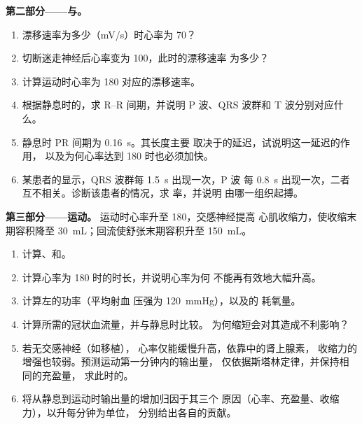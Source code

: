 \begin{problem}
\medskip
\noindent\textbf{第二部分——与。}
\begin{enumerate}[resume]
  \item 漂移速率为多少（\unit{mV/s}）时心率为 70？
  \item 切断迷走神经后心率变为 100，此时的漂移速率
        为多少？
  \item 计算运动时心率为 180 对应的漂移速率。
  \item 根据静息时的，求 R--R 间期，并说明
        P 波、QRS 波群和 T 波分别对应什么。
  \item 静息时 PR 间期为 \qty{0.16}{s}。其长度主要
        取决于的延迟，试说明这一延迟的作用，
        以及为何心率达到 180 时也必须加快。
  \item 某患者的显示，QRS 波群每 \qty{1.5}{s} 出现一次，P 波
        每 \qty{0.8}{s} 出现一次，二者互不相关。诊断该患者的情况，求
        率，并说明
        由哪一组织起搏。
\end{enumerate}

\medskip
\noindent\textbf{第三部分——运动。}
运动时心率升至 180，交感神经提高
心肌收缩力，使收缩末期容积降至
\qty{30}{mL}；回流使舒张末期容积升至
\qty{150}{mL}。
\begin{enumerate}[resume]
  \item 计算、和。
  \item 计算心率为 180 时的时长，并说明心率为何
        不能再有效地大幅升高。
  \item 计算左的功率（平均射血
        压强为 \qty{120}{mmHg}），以及的
        耗氧量。
  \item 计算所需的冠状血流量，并与静息时比较。
        为何缩短会对其造成不利影响？
  \item 若无交感神经（如移植），
        心率仅能缓慢升高，依靠中的肾上腺素，
        收缩力的增强也较弱。预测运动第一分钟内的输出量，
        仅依据斯塔林定律，并保持相同的充盈量，
        求此时的。
  \item 将从静息到运动时输出量的增加归因于其三个
        原因（心率、充盈量、收缩力），以升每分钟为单位，
        分别给出各自的贡献。
\end{enumerate}


\end{problem}
